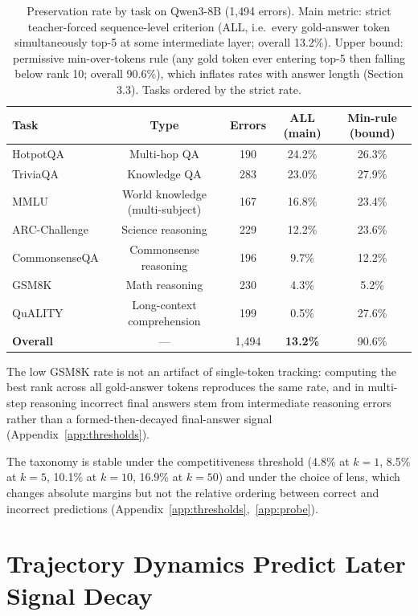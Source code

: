 \documentclass{article} %
\begin{document}
\begin{table}[t]
\centering
\caption{Preservation rate by task on Qwen3-8B (1{,}494 errors). Main metric: strict teacher-forced sequence-level criterion (ALL, i.e.\ every gold-answer token simultaneously top-5 at some intermediate layer; overall 13.2\%). Upper bound: permissive min-over-tokens rule (any gold token ever entering top-5 then falling below rank 10; overall 90.6\%), which inflates rates with answer length (Section 3.3). Tasks ordered by the strict rate.}
\label{tab:taskdecay}
\begin{tabular}{lcccc}
\toprule
\textbf{Task} & \textbf{Type} & \textbf{Errors} & \textbf{ALL (main)} & \textbf{Min-rule (bound)} \\
\midrule
HotpotQA & Multi-hop QA & 190 & 24.2\% & 26.3\% \\
TriviaQA & Knowledge QA & 283 & 23.0\% & 27.9\% \\
MMLU & World knowledge (multi-subject) & 167 & 16.8\% & 23.4\% \\
ARC-Challenge & Science reasoning & 229 & 12.2\% & 23.6\% \\
CommonsenseQA & Commonsense reasoning & 196 & 9.7\% & 12.2\% \\
GSM8K & Math reasoning & 230 & 4.3\% & 5.2\% \\
QuALITY & Long-context comprehension & 199 & 0.5\% & 27.6\% \\
\midrule
\textbf{Overall} & --- & 1{,}494 & \textbf{13.2\%} & 90.6\% \\
\bottomrule
\end{tabular}
\end{table}

The low GSM8K rate is not an artifact of single-token tracking: computing the best rank across all gold-answer tokens reproduces the same rate, and in multi-step reasoning incorrect final answers stem from intermediate reasoning errors rather than a formed-then-decayed final-answer signal (Appendix~\ref{app:thresholds}).

The taxonomy is stable under the competitiveness threshold (4.8\% at $k{=}1$, 8.5\% at $k{=}5$, 10.1\% at $k{=}10$, 16.9\% at $k{=}50$) and under the choice of lens, which changes absolute margins but not the relative ordering between correct and incorrect predictions (Appendix~\ref{app:thresholds},~\ref{app:probe}).

\section{Trajectory Dynamics Predict Later Signal Decay}
\end{document}
